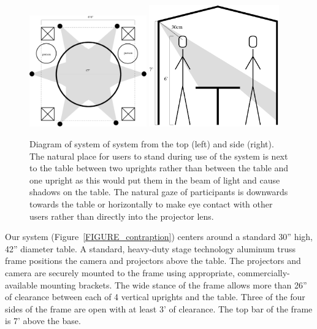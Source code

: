 \documentclass[10pt]{article}
\begin{document}
\begin{figure}
  \begin{center}
    \includegraphics[width=0.45\textwidth]{images/top_view.pdf} \hfill
    \includegraphics[width=0.5\textwidth]{images/side_view.pdf}
  \end{center}
  \caption{Diagram of system of system from the top (left) and side
    (right).  The natural place for users to stand during use of the
    system is next to the table between two uprights rather than
    between the table and one upright as this would put them in the
    beam of light and cause shadows on the table. The natural gaze of
    participants is downwards towards the table or horizontally to
    make eye contact with other users rather than directly into the
    projector lens.
\label{FIGURE_system_diagram}
}
\end{figure}






Our system (Figure~\ref{FIGURE_contraption}) centers around a standard
30'' high, 42'' diameter table.  A standard, heavy-duty stage
technology aluminum truss frame positions the camera and projectors
above the table.  The projectors and camera are securely mounted to
the frame using appropriate, commercially-available mounting brackets.
The wide stance of the frame allows more than 26'' of clearance
between each of 4 vertical uprights and the table.  Three of the four
sides of the frame are open with at least 3' of clearance.  The top
bar of the frame is 7' above the base.  
\end{document}
